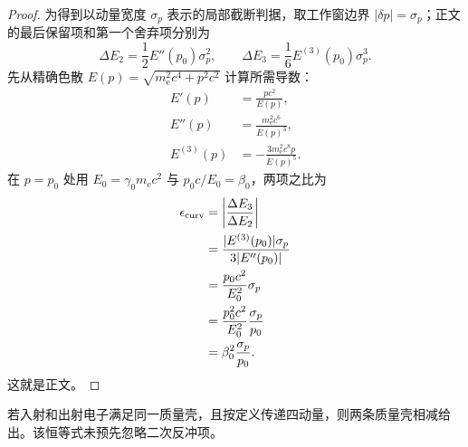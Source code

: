 \begin{proof}
为得到以动量宽度 $\sigma_p$ 表示的局部截断判据，取工作窗边界 $|\delta p|=\sigma_p$；正文 的最后保留项和第一个舍弃项分别为
\[
\Delta E_2=\frac12E''(p_0)\sigma_p^2,
\qquad
\Delta E_3=\frac16E^{(3)}(p_0)\sigma_p^3.
\]
先从精确色散 $E(p)=\sqrt{m_{\mathrm e}^2c^4+p^2c^2}$ 计算所需导数：
\begin{align*}
E'(p)&=\frac{pc^2}{E(p)},\\
E''(p)&=\frac{m_{\mathrm e}^2c^6}{E(p)^3},\\
E^{(3)}(p)
&=-\frac{3m_{\mathrm e}^2c^8p}{E(p)^5}.
\end{align*}
在 $p=p_0$ 处用 $E_0=\gamma_0m_{\mathrm e} c^2$ 与 $p_0c/E_0=\beta_0$，两项之比为
\begin{align*}
\epsilon_{\rm curv}
&=\left|\frac{\Delta E_3}{\Delta E_2}\right|\\
&=\frac{|E^{(3)}(p_0)|\sigma_p}{3|E''(p_0)|}\\
&=\frac{p_0c^2}{E_0^2}\sigma_p\\
&=\frac{p_0^2c^2}{E_0^2}\frac{\sigma_p}{p_0}\\
&=\beta_0^2\frac{\sigma_p}{p_0}.
\end{align*}
这就是正文。
\end{proof}

\begin{proposition}[质量壳上的反冲相位匹配]
若入射和出射电子满足同一质量壳，且按定义传递四动量，则两条质量壳相减给出。该恒等式未预先忽略二次反冲项。
\end{proposition}

